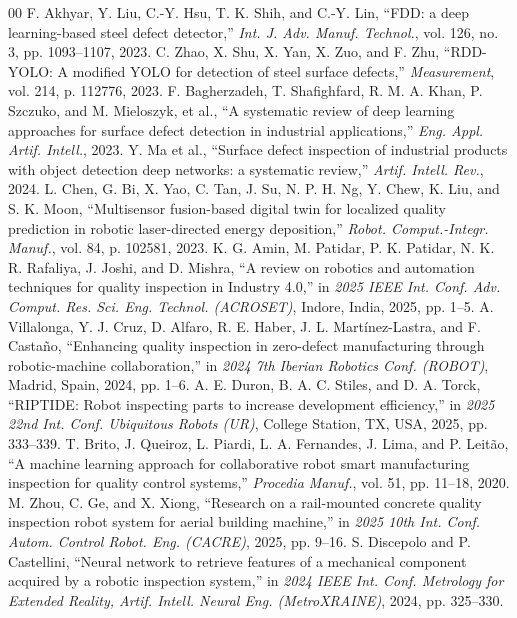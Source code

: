 \documentclass[conference]{IEEEtran}
\begin{document}
\begin{thebibliography}{00}
 F. Akhyar, Y. Liu, C.-Y. Hsu, T. K. Shih, and C.-Y. Lin, ``FDD: a deep learning-based steel defect detector,'' \textit{Int. J. Adv. Manuf. Technol.}, vol. 126, no. 3, pp. 1093--1107, 2023.
 C. Zhao, X. Shu, X. Yan, X. Zuo, and F. Zhu, ``RDD-YOLO: A modified YOLO for detection of steel surface defects,'' \textit{Measurement}, vol. 214, p. 112776, 2023.
 F. Bagherzadeh, T. Shafighfard, R. M. A. Khan, P. Szczuko, and M. Mieloszyk, et al., ``A systematic review of deep learning approaches for surface defect detection in industrial applications,'' \textit{Eng. Appl. Artif. Intell.}, 2023.
 Y. Ma et al., ``Surface defect inspection of industrial products with object detection deep networks: a systematic review,'' \textit{Artif. Intell. Rev.}, 2024.
 L. Chen, G. Bi, X. Yao, C. Tan, J. Su, N. P. H. Ng, Y. Chew, K. Liu, and S. K. Moon, ``Multisensor fusion-based digital twin for localized quality prediction in robotic laser-directed energy deposition,'' \textit{Robot. Comput.-Integr. Manuf.}, vol. 84, p. 102581, 2023.
 K. G. Amin, M. Patidar, P. K. Patidar, N. K. R. Rafaliya, J. Joshi, and D. Mishra, ``A review on robotics and automation techniques for quality inspection in Industry 4.0,'' in \textit{2025 IEEE Int. Conf. Adv. Comput. Res. Sci. Eng. Technol. (ACROSET)}, Indore, India, 2025, pp. 1--5.
 A. Villalonga, Y. J. Cruz, D. Alfaro, R. E. Haber, J. L. Mart\'inez-Lastra, and F. Casta\~no, ``Enhancing quality inspection in zero-defect manufacturing through robotic-machine collaboration,'' in \textit{2024 7th Iberian Robotics Conf. (ROBOT)}, Madrid, Spain, 2024, pp. 1--6.
 A. E. Duron, B. A. C. Stiles, and D. A. Torck, ``RIPTIDE: Robot inspecting parts to increase development efficiency,'' in \textit{2025 22nd Int. Conf. Ubiquitous Robots (UR)}, College Station, TX, USA, 2025, pp. 333--339.
 T. Brito, J. Queiroz, L. Piardi, L. A. Fernandes, J. Lima, and P. Leit\~ao, ``A machine learning approach for collaborative robot smart manufacturing inspection for quality control systems,'' \textit{Procedia Manuf.}, vol. 51, pp. 11--18, 2020.
 M. Zhou, C. Ge, and X. Xiong, ``Research on a rail-mounted concrete quality inspection robot system for aerial building machine,'' in \textit{2025 10th Int. Conf. Autom. Control Robot. Eng. (CACRE)}, 2025, pp. 9--16.
 S. Discepolo and P. Castellini, ``Neural network to retrieve features of a mechanical component acquired by a robotic inspection system,'' in \textit{2024 IEEE Int. Conf. Metrology for Extended Reality, Artif. Intell. Neural Eng. (MetroXRAINE)}, 2024, pp. 325--330.

\end{thebibliography}
\end{document}
